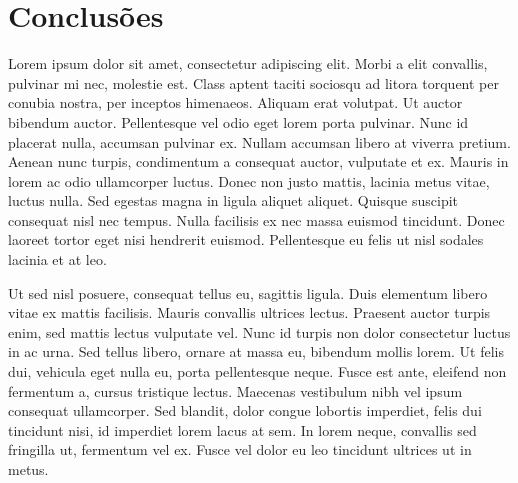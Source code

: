 \section{Conclusões}
Lorem ipsum dolor sit amet, consectetur adipiscing elit. Morbi a elit convallis, pulvinar mi nec, molestie est. Class aptent taciti sociosqu ad litora torquent per conubia nostra, per inceptos himenaeos. Aliquam erat volutpat. Ut auctor bibendum auctor. Pellentesque vel odio eget lorem porta pulvinar. Nunc id placerat nulla, accumsan pulvinar ex. Nullam accumsan libero at viverra pretium. Aenean nunc turpis, condimentum a consequat auctor, vulputate et ex. Mauris in lorem ac odio ullamcorper luctus. Donec non justo mattis, lacinia metus vitae, luctus nulla. Sed egestas magna in ligula aliquet aliquet. Quisque suscipit consequat nisl nec tempus. Nulla facilisis ex nec massa euismod tincidunt. Donec laoreet tortor eget nisi hendrerit euismod. Pellentesque eu felis ut nisl sodales lacinia et at leo.

Ut sed nisl posuere, consequat tellus eu, sagittis ligula. Duis elementum libero vitae ex mattis facilisis. Mauris convallis ultrices lectus. Praesent auctor turpis enim, sed mattis lectus vulputate vel. Nunc id turpis non dolor consectetur luctus in ac urna. Sed tellus libero, ornare at massa eu, bibendum mollis lorem. Ut felis dui, vehicula eget nulla eu, porta pellentesque neque. Fusce est ante, eleifend non fermentum a, cursus tristique lectus. Maecenas vestibulum nibh vel ipsum consequat ullamcorper. Sed blandit, dolor congue lobortis imperdiet, felis dui tincidunt nisi, id imperdiet lorem lacus at sem. In lorem neque, convallis sed fringilla ut, fermentum vel ex. Fusce vel dolor eu leo tincidunt ultrices ut in metus.